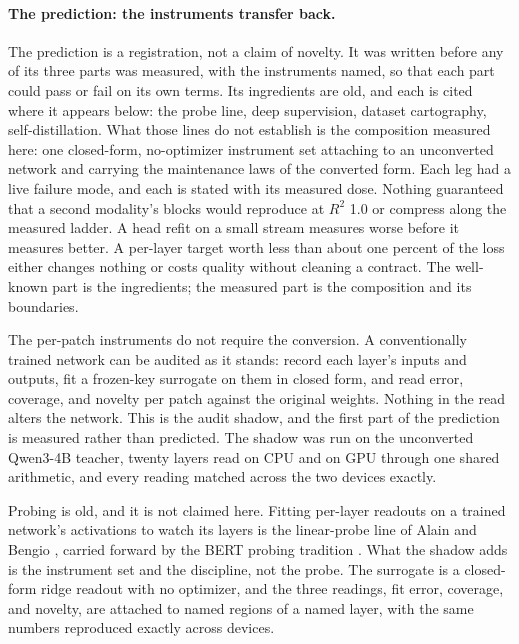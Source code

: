 \documentclass[11pt]{article}
\begin{document}
\paragraph{The prediction: the instruments transfer back.}
The prediction is a registration, not a claim of novelty. It
was written before any of its three parts was measured, with
the instruments named, so that each part could pass or fail on
its own terms. Its ingredients are old, and each is cited where
it appears below: the probe line, deep supervision, dataset
cartography, self-distillation. What those lines do not
establish is the composition measured here: one closed-form,
no-optimizer instrument set attaching to an unconverted
network and carrying the maintenance laws of the converted
form. Each leg had a live failure mode, and each is stated
with its measured dose. Nothing guaranteed that a second
modality's blocks would reproduce at $R^2$ 1.0 or compress
along the measured ladder. A head refit on a small stream
measures worse before it measures better. A per-layer target
worth less than about one percent of the loss either changes
nothing or costs quality without cleaning a contract. The
well-known part is the ingredients; the measured part is the
composition and its boundaries.

The per-patch instruments do not require the conversion. A
conventionally trained network can be audited as it stands:
record each layer's inputs and outputs, fit a frozen-key
surrogate on them in closed form, and read error, coverage, and
novelty per patch against the original weights. Nothing in the
read alters the network. This is the audit shadow, and the first
part of the prediction is measured rather than predicted. The
shadow was run on the unconverted Qwen3-4B teacher, twenty
layers read on CPU and on GPU through one shared arithmetic, and
every reading matched across the two devices exactly.

Probing is old, and it is not claimed here. Fitting per-layer
readouts on a trained network's activations to watch its layers
is the linear-probe line of Alain and Bengio \cite{alain2016},
carried forward by the BERT probing tradition \cite{tenney2019}.
What the shadow adds is the instrument set and the discipline,
not the probe. The surrogate is a closed-form ridge readout with
no optimizer, and the three readings, fit error, coverage, and
novelty, are attached to named regions of a named layer, with
the same numbers reproduced exactly across devices.
\end{document}
